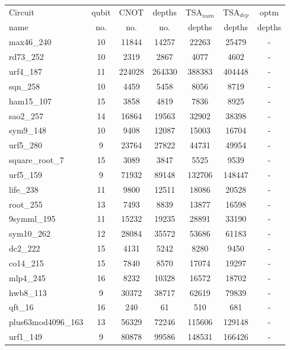 \documentclass[runningheads]{llncs}
\begin{document}
						\begin{table}[!ht]
							\begin{center}  
							\begin{tabular}{|p{4.3cm}<{\centering}|c|c|c|c|c|c|}
							\hline
							Circuit &  qubit  & CNOT &depths &TSA$_{num}$& TSA$_{dep}$  & optm 	  	\\
							name	&   no. 	&	no. & no. & depths&  depths &  depths 	\\
						   \hline
						   max46\_240 & 10 & 11844 & 14257 & 22263 & 25479 & - \\
						   rd73\_252 & 10 & 2319 & 2867 & 4077 & 4602 & - \\
						   urf4\_187 & 11 & 224028 & 264330 & 388383 & 404448 & - \\
						   sqn\_258 & 10 & 4459 & 5458 & 8056 & 8719 & - \\
						   ham15\_107 & 15 & 3858 & 4819 & 7836 & 8925 & - \\
						   sao2\_257 & 14 & 16864 & 19563 & 32902 & 38398 & - \\
						   sym9\_148 & 10 & 9408 & 12087 & 15003 & 16704 & - \\
						   urf5\_280 & 9 & 23764 & 27822 & 44731 & 49954 & - \\
						   square\_root\_7 & 15 & 3089 & 3847 & 5525 & 9539 & - \\
						   urf5\_159 & 9 & 71932 & 89148 & 132706 & 148447 & - \\
						   life\_238 & 11 & 9800 & 12511 & 18086 & 20528 & - \\
						   root\_255 & 13 & 7493 & 8839 & 13877 & 16598 & - \\
						   9symml\_195 & 11 & 15232 & 19235 & 28891 & 33190 & - \\
						   sym10\_262 & 12 & 28084 & 35572 & 53686 & 61183 & - \\
						   dc2\_222 & 15 & 4131 & 5242 & 8280 & 9450 & - \\
						   co14\_215 & 15 & 7840 & 8570 & 17074 & 19297 & - \\
						   mlp4\_245 & 16 & 8232 & 10328 & 16572 & 18702 & - \\
						   hwb8\_113 & 9 & 30372 & 38717 & 62619 & 79839 & - \\
						   qft\_16 & 16 & 240 & 61 & 510 & 681 & - \\
						   plus63mod4096\_163 & 13 & 56329 & 72246 & 115606 & 129148 & - \\
						   urf1\_149 & 9 & 80878 & 99586 & 148531 & 166426 & - \\

\end{tabular}
\end{center}
\end{table}
\end{document}
